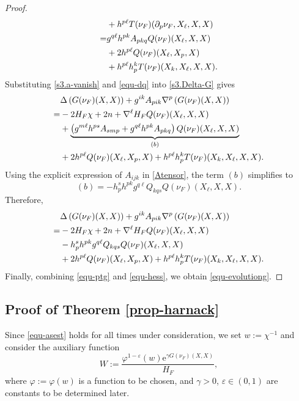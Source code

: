 \documentclass[11pt,reqno]{amsart}
\theoremstyle{definition}
\theoremstyle{remark}
\numberwithin{equation}{section}
\begin{document}
\begin{proof}
\begin{align}
			&+ h^{p\ell}T(\nu_F)(\partial_p \nu_F,X_{\ell},X,X) \notag\\
			=& g^{q\ell}h^{pk}A_{pkq}Q(\nu_F)(X_{\ell},X,X) \nonumber\\
			&+ 2h^{p\ell}Q(\nu_F)(X_{\ell},X_{p},X) \notag\\
			& + h^{p\ell}h^k_p T(\nu_F)(X_k,X_{\ell},X,X). \label{equ-dq}
		\end{align}
        Substituting \eqref{s3.a-vanish} and \eqref{equ-dq} into \eqref{s3.Delta-G} gives
		\begin{align*}
			& \Delta\left( G(\nu_F)(X,X) \right) + g^{ik}A_{pik}\nabla^p\left( G(\nu_F)(X,X) \right) \notag\\
			=& -2H_F \chi + 2n + \nabla^{\ell}H_F Q(\nu_F)(X_{\ell},X,X) \nonumber\\
			& + \underbrace{\left(g^{m\ell}h^{ps}A_{smp}+g^{q\ell}h^{pk}A_{pkq}\right)Q(\nu_F)(X_{\ell},X,X)}_{(b)} \nonumber\\
			& + 2h^{p\ell}Q(\nu_F)(X_{\ell},X_{p},X) + h^{p\ell}h^k_p T(\nu_F)(X_k,X_{\ell},X,X).
		\end{align*}
		Using the explicit expression of $A_{ijk}$ in \eqref{Atensor}, the term $(b)$ simplifies to
		\begin{equation*}
			(b)	= -h^s_p h^{pk}g^{q\ell} Q_{kqs}Q(\nu_F)(X_{\ell},X,X).
		\end{equation*}
		Therefore,
		\begin{align}
			& \Delta\left( G(\nu_F)(X,X) \right) + g^{ik}A_{pik}\nabla^p\left( G(\nu_F)(X,X) \right) \notag\\
			=& -2H_F \chi + 2n + \nabla^{\ell}H_F Q(\nu_F)(X_{\ell},X,X) \nonumber\\
			& -h^s_p h^{pk}g^{q\ell} Q_{kqs}Q(\nu_F)(X_{\ell},X,X) \nonumber\\
			& + 2h^{p\ell}Q(\nu_F)(X_{\ell},X_{p},X) + h^{p\ell}h^k_p T(\nu_F)(X_k,X_{\ell},X,X). \label{equ-hess}
		\end{align}		
		Finally, combining \eqref{equ-ptg} and \eqref{equ-hess}, we obtain \eqref{equ-evolutiong}. 
	\end{proof}
	
	\subsection{Proof of Theorem \ref{prop-harnack}}
	
		Since \eqref{equ-asest} holds for all times under consideration, we set $w:=\chi^{-1}$ and consider the auxiliary function
		\begin{equation}
			\label{equ-W}
			W:= \dfrac{\varphi^{1-\varepsilon}(w)\mathrm{e}^{\gamma G(\nu_F)(X,X)}}{H_F},
		\end{equation}
		where $\varphi:=\varphi(w)$ is a function to be chosen, and $\gamma>0$, $\varepsilon\in(0,1)$ are constants to be determined later.
		
\end{document}
